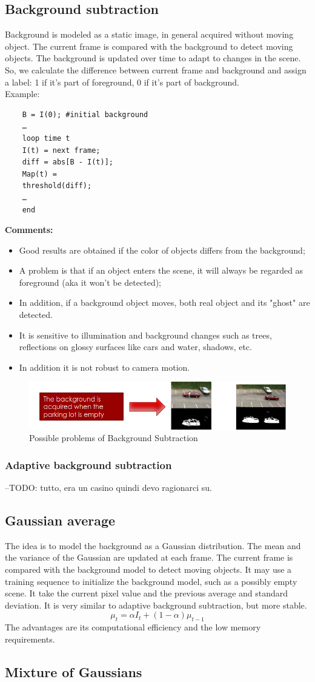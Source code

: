 \subsection{Background subtraction}
Background is modeled as a static image, in general acquired without moving object. The current frame is compared with the background to detect moving objects. The background is updated over time to adapt to changes in the scene.
So, we calculate the difference between current frame and background and assign a label: 1 if it's part of foreground, 0 if it's part of background. 
\\Example: 
\begin{verbatim}
    B = I(0); #initial background
    …
    loop time t
    I(t) = next frame;
    diff = abs[B - I(t)];
    Map(t) =
    threshold(diff);
    …
    end
\end{verbatim} 
\textbf{Comments:}
\begin{itemize}
    \item Good results are obtained if the color of objects differs from the background;
    \item A problem is that if an object enters the scene, it will always be regarded as foreground (aka it won't be detected);
    \item In addition, if a background object moves, both real object and its "ghost" are detected.
    \item It is sensitive to illumination and background changes such as trees, reflections on glossy surfaces like cars and water, shadows, etc.
    \item In addition it is not robust to camera motion.
\end{itemize}
\begin{figure}[h]
    \centering
    \includegraphics[scale=0.4]{Figures/BackgroundSub.png}
    \caption{Possible problems of Background Subtraction}
\end{figure}
\subsubsection{Adaptive background subtraction}
--TODO: tutto, era un casino quindi devo ragionarci su.
\subsection{Gaussian average}
The idea is to model the background as a Gaussian distribution. The mean and the variance of the Gaussian are updated at each frame. The current frame is compared with the background model to detect moving objects.
It may use a training sequence to initialize the background model, such as a possibly empty scene.
It take the current pixel value and the previous average and standard deviation. It is very similar to adaptive background subtraction, but more stable.
\[
    \mu_{t} = \alpha I_t + (1-\alpha)\mu_{t-1}
\]
The advantages are its computational efficiency and the low memory requirements.
\subsection{Mixture of Gaussians}
